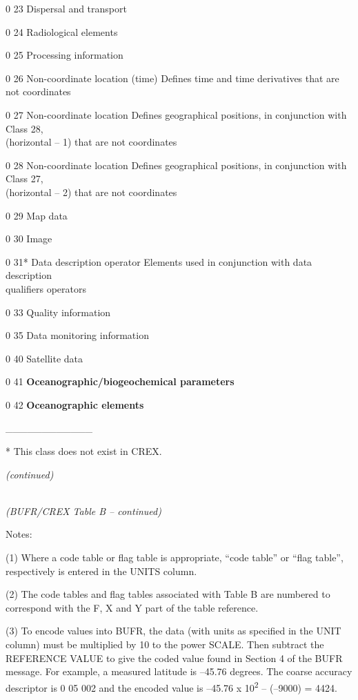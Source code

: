 0 23 Dispersal and transport

0 24 Radiological elements

0 25 Processing information

0 26 Non-coordinate location (time) Defines time and time derivatives that are not coordinates

0 27 Non-coordinate location Defines geographical positions, in conjunction with Class 28,\\
(horizontal -- 1) that are not coordinates

0 28 Non-coordinate location Defines geographical positions, in conjunction with Class 27,\\
(horizontal -- 2) that are not coordinates

0 29 Map data

0 30 Image

0 31* Data description operator Elements used in conjunction with data description\\
qualifiers operators

0 33 Quality information

0 35 Data monitoring information

0 40 Satellite data

0 41 \textbf{Oceanographic/biogeochemical parameters}

0 42 \textbf{Oceanographic elements}

\_\_\_\_\_\_\_\_\_\_\_\_

* This class does not exist in CREX.

\emph{(continued)}

\emph{\\
(BUFR/CREX Table B -- continued)}

Notes:

(1) Where a code table or flag table is appropriate, ``code table'' or ``flag table'', respectively is entered in the UNITS column.

(2) The code tables and flag tables associated with Table B are numbered to correspond with the F, X and Y part of the table reference.

(3) To encode values into BUFR, the data (with units as specified in the UNIT column) must be multiplied by 10 to the power SCALE. Then subtract the REFERENCE VALUE to give the coded value found in Section 4 of the BUFR message. For example, a measured latitude is --45.76 degrees. The coarse accuracy descriptor is 0 05 002 and the encoded value is --45.76 x 10\textsuperscript{2} -- (--9000) = 4424.

